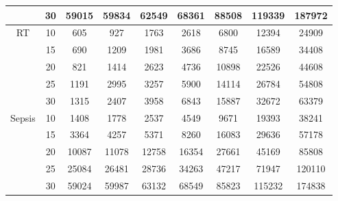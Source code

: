 \begin{table}[]
{\begin{tabular}{|c|c|ccccccc|}
&30                                                           & 59015  & 59834  & 62549 & 68361  & 88508  & 119339  & 187972  \\
\hline
\hline
\multirow{5}{*}{RT} &10                                       & 605 & 927  & 1763  & 2618 & 6800 & 12394 & 24909    \\
&15                                                           & 690  & 1209  & 1981  & 3686  & 8745  & 16589  & 34408  \\
&20                                                           & 821 & 1414  & 2623  & 4736  & 10898 & 22526  & 44608  \\
&25                                                           & 1191  & 2995  & 3257 & 5900  & 14114  & 26784  & 54808 \\
&30                                                           & 1315  & 2407  & 3958 & 6843  & 15887  & 32672  & 63379  \\
\hline
\hline
\multirow{5}{*}{Sepsis} &10                                   & 1408 & 1778  & 2537  & 4549 & 9671 & 19393 & 38241    \\
&15                                                           & 3364  & 4257  & 5371  & 8260  & 16083  & 29636  & 57178  \\
&20                                                           & 10087 & 11078  & 12758  & 16354  & 27661 & 45169  & 85808  \\
&25                                                           & 25084  & 26481  & 28736 & 34263  & 47217  & 71947  & 120110 \\
&30                                                           & 59024  & 59987  & 63132 & 68549  & 85823  & 115232  & 174838  \\
\hline
\end{tabular}
}
\end{table}
